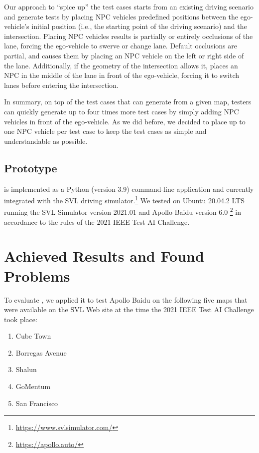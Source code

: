 \documentclass[conference]{IEEEtran}
\begin{document}
Our approach to ``spice up'' the test cases starts from an existing driving scenario and generate tests by placing NPC vehicles predefined positions between the ego-vehicle's initial position (i.e., the starting point of the driving scenario) and the intersection. Placing NPC vehicles results is partially or entirely occlusions of the lane, forcing the ego-vehicle to swerve or change lane. Default occlusions are partial, and \tool causes them by placing an NPC vehicle on the left or right side of the lane. Additionally, if the geometry of the intersection allows it, \tool places an NPC in the middle of the lane in front of the ego-vehicle, forcing it to switch lanes before entering the intersection.

In summary, on top of the test cases that \tool can generate from a given map, testers can quickly generate up to four times more test cases by simply adding NPC vehicles in front of the ego-vehicle. As we did before, we decided to place up to one NPC vehicle per test case to keep the test cases as simple and understandable as possible.

\subsection{Prototype}
\tool is implemented as a Python (version 3.9) command-line application and currently integrated with the SVL driving simulator.\footnote{\href{https://www.svlsimulator.com/}{https://www.svlsimulator.com/}} 
%
We tested \tool on Ubuntu 20.04.2 LTS running the SVL Simulator version 2021.01 and Apollo Baidu version 6.0 \footnote{\href{https://apollo.auto/}{https://apollo.auto/}} in accordance to the rules of the 2021 IEEE Test AI Challenge.

\section{Achieved Results and Found Problems}
To evaluate \tool, we applied it to test Apollo Baidu on the following five maps that were available on the SVL Web site at the time the 2021 IEEE Test AI Challenge took place:

\begin{enumerate}
 \item Cube Town
 \item Borregas Avenue
 \item Shalun
 \item GoMentum
 \item San Francisco
\end{enumerate}
\end{document}
